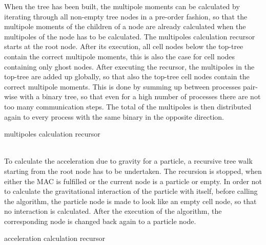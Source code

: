 When the tree has been built, the multipole moments can be calculated by iterating through all non-empty tree nodes in a pre-order fashion, so that the multipole moments of the children of a node are already calculated when the multipoles of the node has to be calculated. The multipoles calculation recursor starts at the root node. After its execution, all cell nodes below the top-tree contain the correct multipole moments, this is also the case for cell nodes containing only ghost nodes. After executing the recursor, the multipoles in the top-tree are added up globally, so that also the top-tree cell nodes contain the correct multipole moments. This is done by summing up between processes pair-wise with a binary tree, so that even for a high number of processes there are not too many communication steps. The total of the multipoles is then distributed again to every process with the same binary in the opposite direction.
\begin{algorithm}
\caption{multipoles calculation recursor}
\begin{algorithmic}
\label{alg:multipolecalc}
\ELSE
{}
\ENDIF
\ENDFOR
\ENDIF
\end{algorithmic}
\end{algorithm}
\\

To calculate the acceleration due to gravity for a particle, a recursive tree walk starting from the root node has to be undertaken. The recursion is stopped, when either the MAC is fulfilled or the current node is a particle or empty. In order not to calculate the gravitational interaction of the particle with itself, before calling the algorithm, the particle node is made to look like an empty cell node, so that no interaction is calculated. After the execution of the algorithm, the corresponding node is changed back again to a particle node.
\begin{algorithm}
\caption{acceleration calculation recursor}
\begin{algorithmic}
\label{alg:calcgravity}
\ELSE
{}
\ENDFOR
\ENDIF
\end{algorithmic}
\end{algorithm}\\

